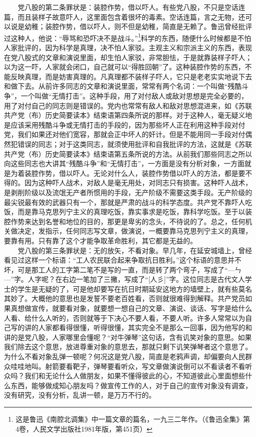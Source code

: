 \documentclass[cn,11pt,chinese]{elegantbook}
\begin{document}
　　党八股的第二条罪状是：装腔作势，借以吓人。有些党八股，不只是空话连篇，而且装样子故意吓人，这里面包含着很坏的毒素。空话连篇，言之无物，还可以说是幼稚；装腔作势，借以吓人，则不但是幼稚，简直是无赖了。鲁迅曾经批评过这种人，他说：“辱骂和恐吓决不是战斗。”\footnote[7]{ 这是鲁迅《南腔北调集》中一篇文章的篇名，一九三二年作。（《鲁迅全集》第4卷，人民文学出版社1981年版，第451页）}科学的东西，随便什么时候都是不怕人家批评的，因为科学是真理，决不怕人家驳。主观主义和宗派主义的东西，表现在党八股式的文章和演说里面，却生怕人家驳，非常胆怯，于是就靠装样子吓人；以为这一吓，人家就会闭口，自己就可以“得胜回朝”了。这种装腔作势的东西，不能反映真理，而是妨害真理的。凡真理都不装样子吓人，它只是老老实实地说下去和做下去。从前许多同志的文章和演说里面，常常有两个名词：一个叫做“残酷斗争”，一个叫做“无情打击”。这种手段，用了对付敌人或敌对思想是完全必要的，用了对付自己的同志则是错误的。党内也常常有敌人和敌对思想混进来，如《苏联共产党（布）历史简要读本》结束语第四条所说的那样。对于这种人，毫无疑义地是应该采用残酷斗争或无情打击的手段的，因为那些坏人正在利用这种手段对付党，我们如果还对他们宽容，那就会正中坏人的奸计。但是不能用同一手段对付偶然犯错误的同志；对于这类同志，就须使用批评和自我批评的方法，这就是《苏联共产党（布）历史简要读本》结束语第五条所说的方法。从前我们那些同志之所以向这些同志也大讲其“残酷斗争”和“无情打击”，一方面是没有分析对象，一方面就是为着装腔作势，借以吓人。无论对什么人，装腔作势借以吓人的方法，都是要不得的。因为这种吓人战术，对敌人是毫无用处，对同志只有损害。这种吓人战术，是剥削阶级以及流氓无产者所惯用的手段，无产阶级不需要这类手段。无产阶级的最尖锐最有效的武器只有一个，那就是严肃的战斗的科学态度。共产党不靠吓人吃饭，而是靠马克思列宁主义的真理吃饭，靠实事求是吃饭，靠科学吃饭。至于以装腔作势来达到名誉和地位的目的，那更是卑劣的念头，不待说的了。总之，任何机关做决定，发指示，任何同志写文章，做演说，一概要靠马克思列宁主义的真理，要靠有用。只有靠了这个才能争取革命胜利，其它都是无益的。\\
　　党八股的第三条罪状是：无的放矢，不看对象。早几年，在延安城墙上，曾经看见过这样一个标语：“工人农民联合起来争取抗日胜利。”这个标语的意思并不坏，可是那工人的工字第二笔不是写的一直，而是转了两个弯子，写成了“—ㄣ—”字。人字呢？在右边一笔加了三撇，写成了“[人彡]”字。这位同志是古代文人学士的学生是无疑的了，可是他却要写在抗日时期延安这地方的墙壁上，就有些莫名其妙了。大概他的意思也是发誓不要老百姓看，否则就很难得到解释。共产党员如果真想做宣传，就要看对象，就要想一想自己的文章、演说、谈话、写字是给什么人看、给什么人听的，否则就等于下决心不要人看，不要人听。许多人常常以为自己写的讲的人家都看得很懂，听得很懂，其实完全不是那么一回事，因为他写的和讲的是党八股，人家哪里会懂呢？“对牛弹琴”这句话，含有讥笑对象的意思。如果我们除去这个意思，放进尊重对象的意思去，那就只剩下讥笑弹琴者这个意思了。为什么不看对象乱弹一顿呢？何况这是党八股，简直是老鸦声调，却偏要向人民群众哇哇地叫。射箭要看靶子，弹琴要看听众，写文章做演说倒可以不看读者不看听众吗？我们和无论什么人做朋友，如果不懂得彼此的心，不知道彼此心里面想些什么东西，能够做成知心朋友吗？做宣传工作的人，对于自己的宣传对象没有调查，没有研究，没有分析，乱讲一顿，是万万不行的。\\
\end{document}
